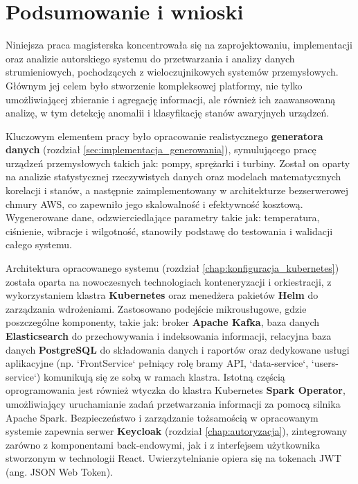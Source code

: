\section{Podsumowanie i wnioski}
\label{sec:podsumowanie_wnioski}

Niniejsza praca magisterska koncentrowała się na zaprojektowaniu, implementacji oraz analizie autorskiego systemu do przetwarzania i analizy danych strumieniowych, pochodzących z wieloczujnikowych systemów przemysłowych. Głównym jej celem było stworzenie kompleksowej platformy, nie tylko umożliwiającej zbieranie i agregację informacji, ale również ich zaawansowaną analizę, w tym detekcję anomalii i klasyfikację stanów awaryjnych urządzeń.

Kluczowym elementem pracy było opracowanie realistycznego \textbf{generatora danych} (rozdział \ref{sec:implementacja_generowania}), symulującego pracę urządzeń przemysłowych takich jak: pompy, sprężarki i turbiny. Został on oparty na analizie statystycznej rzeczywistych danych oraz modelach matematycznych korelacji i stanów, a następnie zaimplementowany w architekturze bezserwerowej chmury AWS, co zapewniło jego skalowalność i efektywność kosztową. Wygenerowane dane, odzwierciedlające parametry takie jak: temperatura, ciśnienie, wibracje i wilgotność, stanowiły podstawę do testowania i walidacji całego systemu.

Architektura opracowanego systemu (rozdział \ref{chap:konfiguracja_kubernetes}) została oparta na nowoczesnych technologiach konteneryzacji i orkiestracji, z wykorzystaniem klastra \textbf{Kubernetes} oraz menedżera pakietów \textbf{Helm} do zarządzania wdrożeniami. Zastosowano podejście mikrousługowe, gdzie poszczególne komponenty, takie jak: broker \textbf{Apache Kafka}, baza danych \textbf{Elasticsearch} do przechowywania i indeksowania informacji, relacyjna baza danych \textbf{PostgreSQL} do składowania danych i raportów oraz dedykowane usługi aplikacyjne (np. `FrontService` pełniący rolę bramy API, `data-service`, `users-service`) komunikują się ze sobą w ramach klastra. Istotną częścią oprogramowania jest również wtyczka do klastra Kubernetes \textbf{Spark Operator}, umożliwiający uruchamianie zadań przetwarzania informacji za pomocą silnika Apache Spark. Bezpieczeństwo i zarządzanie tożsamością w opracowanym systemie zapewnia serwer \textbf{Keycloak} (rozdział \ref{chap:autoryzacja}), zintegrowany zarówno z komponentami back-endowymi, jak i z interfejsem użytkownika stworzonym w technologii React. Uwierzytelnianie opiera się na tokenach JWT (ang. JSON Web Token).

